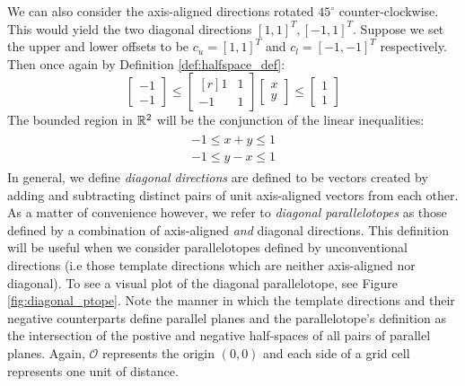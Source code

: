 \begin{example}
  \label{ex:simple_diag_ptope}
  We can also consider the axis-aligned directions rotated $45^\circ$ counter-clockwise. This would yield the two diagonal directions $[1,1]^T, [-1,1]^T$. Suppose we set the upper and lower offsets to be $c_u = [1,1]^T$ and $c_l = [-1,-1]^T$ respectively. Then once again by Definition \ref{def:halfspace_def}:
  \begin{equation}
  \begin{bmatrix}
    -1 \\ -1
  \end{bmatrix} \leq \begin{bmatrix*}[r]
      1 & 1 \\ -1 & 1
    \end{bmatrix*}\begin{bmatrix}
     x \\ y
    \end{bmatrix} \leq \begin{bmatrix}
      1 \\ 1
    \end{bmatrix}
  \end{equation}
  The bounded region in ${\mathbb{R}}^2$ will be the conjunction of the linear inequalities:
  \begin{align}
    \begin{split}
    -1 \leq x + y \leq 1 \\
    -1 \leq y - x \leq 1
    \end{split}
  \end{align}
  In general, we define \emph{diagonal directions} are defined to be vectors created by adding and subtracting distinct pairs of unit axis-aligned vectors from each other. As a matter of convenience however, we refer to \emph{diagonal parallelotopes} as those defined by a combination of axis-aligned \emph{and} diagonal directions. This definition will be useful when we consider parallelotopes defined by unconventional directions (i.e those template directions which are neither axis-aligned nor diagonal). To see a visual plot of the diagonal parallelotope, see Figure \ref{fig:diagonal_ptope}. Note the manner in which the template directions and their negative counterparts define parallel planes and the parallelotope's definition as the intersection of the postive and negative half-spaces of all pairs of parallel planes. Again, $\mathcal{O}$ represents the origin $(0,0)$ and each side of a grid cell represents one unit of distance.


\end{example}
